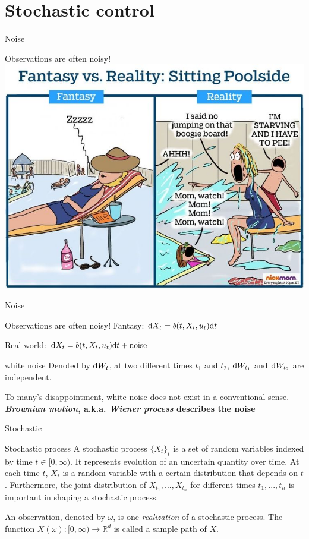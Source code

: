 \documentclass[color=usenames,dvipsnames]{beamer}
\newcommand{\dt}{\text{\normalfont d}t}
\newcommand{\dX}{\text{\normalfont d}X}
\newcommand{\dW}{\text{\normalfont d}W}
\begin{document}
\section{Stochastic control}
\begin{frame}{Noise}
    \begin{block}
        {Observations are often noisy!}
        \includegraphics[scale=.3]{Control_lecture_notes/Figs/rf.jpg}
    \end{block}
\end{frame}
\begin{frame}{Noise}
    \begin{block}
        {Observations are often noisy!}
        Fantasy: $\dX_t=b(t,X_t,u_t)\dt$

        Real world: $\dX_t=b(t,X_t,u_t)\dt+\text{noise}$
    \end{block}
    \begin{block}{white noise} Denoted by $\dW_t$, at two different times $t_1$ and $t_2$, $\dW_{t_1}$ and $\dW_{t_2}$ are independent.

        To many's disappointment, white noise does not exist in a conventional sense. \textbf{\emph{Brownian motion}, a.k.a. \emph{Wiener process} describes the noise}
    \end{block}
\end{frame}
\begin{frame}{Stochastic}
\begin{block}{Stochastic process}
A stochastic process $\{X_t\}_{t}$ is a set of random variables indexed by time $t\in[0,\infty)$. It represents evolution of an uncertain quantity over time. At each time $t$, $X_t$ is a random variable with a certain distribution that depends on $t$. Furthermore, the joint distribution of $X_{t_1},...,X_{t_n}$ for different times $t_1,...,t_n$ is important in shaping a stochastic process.

An observation, denoted by $\omega$, is one \emph{realization} of a stochastic process. The function $X(\omega):[0,\infty)\to\mathbb{R}^d$ is called a sample path of $X$.
\end{block}
    
\end{frame}
\end{document}
